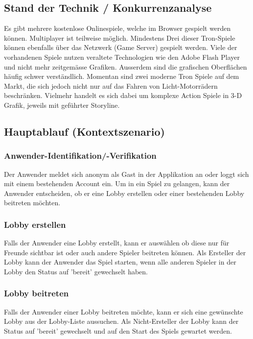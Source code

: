 \documentclass[11pt,ngerman]{article}
\begin{document}
    \subsection{Stand der Technik / Konkurrenzanalyse}
    Es gibt mehrere kostenlose Onlinespiele, welche im Browser gespielt werden können. \Gls{Multiplayer} ist teilweise möglich. Mindestens Drei dieser Tron-Spiele können ebenfalls über das Netzwerk (\Gls{Game Server}) gespielt werden. \cite{TronGameBasisKostenlosOnline}\cite{sphinxCyclewarsIoOnline}\cite{TronLightCyclesEu}\cite{PlayersOnlineXtremeTron}
    Viele der vorhandenen Spiele nutzen veraltete Technologien wie den \Gls{Adobe Flash Player} \cite{SayingGoodbyeFlash2017}\cite{FlashFutureInteractive2017} und nicht mehr zeitgemässe Grafiken. Ausserdem sind die grafischen Oberflächen häufig schwer verständlich.
    Momentan sind zwei moderne Tron Spiele auf dem Markt, die sich jedoch nicht nur auf das Fahren von Licht-Motorrädern beschränken. Vielmehr handelt es sich dabei um komplexe Action Spiele in 3-D Grafik, jeweils mit geführter Storyline.\cite{TronEvolution2020}\cite{TRONRUNr}

    \subsection{Hauptablauf (Kontextszenario)}

    \subsubsection{Anwender-Identifikation/-Verifikation}
	Der Anwender meldet sich anonym als Gast in der Applikation an oder loggt sich mit einem bestehenden Account ein. Um in ein Spiel zu gelangen, kann der Anwender entscheiden, ob er eine Lobby erstellen oder einer bestehenden Lobby beitreten möchten.

	\subsubsection{\Gls{Lobby} erstellen}
	Falls der Anwender eine Lobby erstellt, kann er auswählen ob diese nur für Freunde sichtbar ist oder auch andere Spieler beitreten können. Als Ersteller der Lobby kann der Anwender das Spiel starten, wenn alle anderen Spieler in der Lobby den Status auf 'bereit' gewechselt haben.

	\subsubsection{\Gls{Lobby} beitreten}
	Falls der Anwender einer Lobby beitreten möchte, kann er sich eine gewünschte Lobby aus der Lobby-Liste aussuchen. Als Nicht-Ersteller der Lobby kann der Status auf 'bereit' gewechselt und auf den Start des Spiels gewartet werden.
\end{document}
